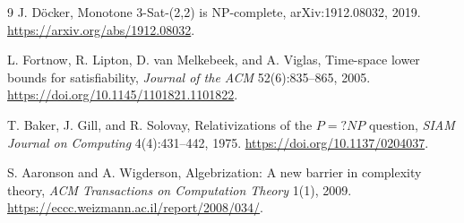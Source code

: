 \documentclass[11pt]{article}
\begin{document}
\begin{thebibliography}{9}
J. D\"ocker,
Monotone 3-Sat-(2,2) is NP-complete,
arXiv:1912.08032, 2019.
\url{https://arxiv.org/abs/1912.08032}.

L. Fortnow, R. Lipton, D. van Melkebeek, and A. Viglas,
Time-space lower bounds for satisfiability,
\emph{Journal of the ACM} 52(6):835--865, 2005.
\url{https://doi.org/10.1145/1101821.1101822}.

T. Baker, J. Gill, and R. Solovay,
Relativizations of the $P=?NP$ question,
\emph{SIAM Journal on Computing} 4(4):431--442, 1975.
\url{https://doi.org/10.1137/0204037}.

S. Aaronson and A. Wigderson,
Algebrization: A new barrier in complexity theory,
\emph{ACM Transactions on Computation Theory} 1(1), 2009.
\url{https://eccc.weizmann.ac.il/report/2008/034/}.
\end{thebibliography}

\end{document}
